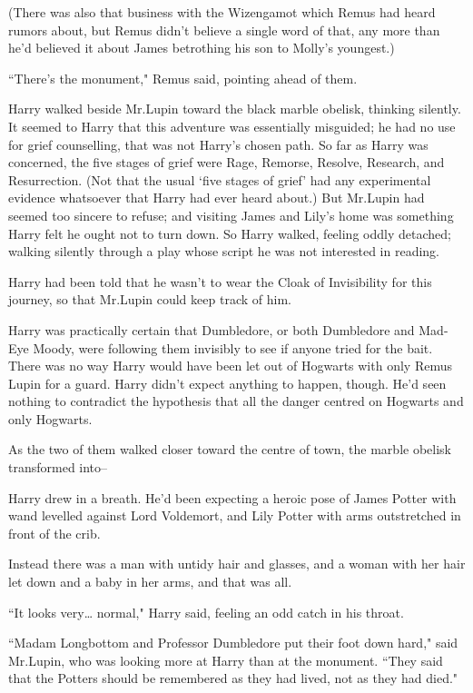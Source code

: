 (There was also that business with the Wizengamot which Remus had heard rumors about, but Remus didn't believe a single word of that, any more than he'd believed it about James betrothing his son to Molly's youngest.)

``There's the monument," Remus said, pointing ahead of them.

\later

Harry walked beside Mr.\?Lupin toward the black marble obelisk, thinking silently. It seemed to Harry that this adventure was essentially misguided; he had no use for grief counselling, that was not Harry's chosen path. So far as Harry was concerned, the five stages of grief were Rage, Remorse, Resolve, Research, and Resurrection. (Not that the usual `five stages of grief' had any experimental evidence whatsoever that Harry had ever heard about.) But Mr.\?Lupin had seemed too sincere to refuse; and visiting James and Lily's home was something Harry felt he ought not to turn down. So Harry walked, feeling oddly detached; walking silently through a play whose script he was not interested in reading.

Harry had been told that he wasn't to wear the Cloak of Invisibility for this journey, so that Mr.\?Lupin could keep track of him.

Harry was practically certain that Dumbledore, or both Dumbledore and Mad-Eye Moody, were following them invisibly to see if anyone tried for the bait. There was no way Harry would have been let out of Hogwarts with only Remus Lupin for a guard. Harry didn't expect anything to happen, though. He'd seen nothing to contradict the hypothesis that all the danger centred on Hogwarts and only Hogwarts.

As the two of them walked closer toward the centre of town, the marble obelisk transformed into\---

Harry drew in a breath. He'd been expecting a heroic pose of James Potter with wand levelled against Lord Voldemort, and Lily Potter with arms outstretched in front of the crib.

Instead there was a man with untidy hair and glasses, and a woman with her hair let down and a baby in her arms, and that was all.

``It looks very{\ldots} normal," Harry said, feeling an odd catch in his throat.

``Madam Longbottom and Professor Dumbledore put their foot down hard," said Mr.\?Lupin, who was looking more at Harry than at the monument. ``They said that the Potters should be remembered as they had lived, not as they had died."


